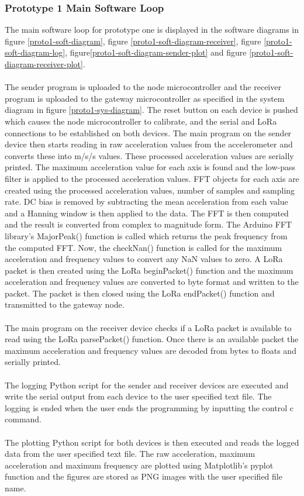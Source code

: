 \subsubsection{Prototype 1 Main Software Loop}
The main software loop for prototype one is displayed in the software diagrams in figure \ref{proto1-soft-diagram}, figure \ref{proto1-soft-diagram-receiver}, figure \ref{proto1-soft-diagram-log}, figure\ref{proto1-soft-diagram-sender-plot} and figure \ref{proto1-soft-diagram-receiver-plot}.\\\\
The sender program is uploaded to the node microcontroller and the receiver program is uploaded to the gateway microcontroller as specified in the system diagram in figure \ref{proto1-sys-diagram}. The reset button on each device is pushed which causes the node microcontroller to calibrate, and the serial and LoRa connections to be established on both devices. The main program on the sender device then starts reading in raw acceleration values from the accelerometer and converts these into m/s/s values. These processed acceleration values are serially printed. The maximum acceleration value for each axis is found and the low-pass filter is applied to the processed acceleration values. FFT objects for each axis are created using the processed acceleration values, number of samples and sampling rate. DC bias is removed by subtracting the mean acceleration from each value and a Hanning window is then applied to the data. The FFT is then computed and the result is converted from complex to magnitude form. The Arduino FFT library's MajorPeak() function is called which returns the peak frequency from the computed FFT. Now, the checkNan() function is called for the maximum acceleration and frequency values to convert any NaN values to zero. A LoRa packet is then created using the LoRa beginPacket() function and the maximum acceleration and frequency values are converted to byte format and written to the packet. The packet is then closed using the LoRa endPacket() function and transmitted to the gateway node.\\\\
The main program on the receiver device checks if a LoRa packet is available to read using the LoRa parsePacket() function. Once there is an available packet the maximum acceleration and frequency values are decoded from bytes to floats and serially printed.\\\\
The logging Python script for the sender and receiver devices are executed and write the serial output from each device to the user specified text file. The logging is ended when the user ends the programming by inputting the control c command.\\\\
The plotting Python script for both devices is then executed and reads the logged data from the user specified text file. The raw acceleration, maximum acceleration and maximum frequency are plotted using Matplotlib's pyplot function and the figures are stored as PNG images with the user specified file name. 

